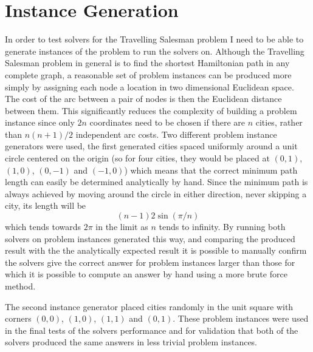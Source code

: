 \documentclass[12pt,a4paper,twoside,openright]{report}
\begin{document}
\section{Instance Generation}
In order to test solvers for the Travelling Salesman problem I need to be able to generate instances of the problem to run the solvers on. Although the Travelling Salesman problem in general is to find the shortest Hamiltonian path in any complete graph, a reasonable set of problem instances can be produced more simply by assigning each node a location in two dimensional Euclidean space\cite{advancedalgos}. The cost of the arc between a pair of nodes is then the Euclidean distance between them. This significantly reduces the complexity of building a problem instance since only $2n$ coordinates need to be chosen if there are $n$ cities, rather than $n(n+1)/2$ independent arc costs. Two different problem instance generators were used, the first generated cities spaced uniformly around a unit circle centered on the origin (so for four cities, they would be placed at $(0,1)$, $(1,0)$, $(0, -1)$ and $(-1, 0)$) which means that the correct minimum path length can easily be determined analytically by hand. Since the minimum path is always achieved by moving around the circle in either direction, never skipping a city, its length will be
$$
(n-1)2\sin(\pi/n)
$$
which tends towards $2\pi$ in the limit as $n$ tends to infinity. By running both solvers on problem instances generated this way, and comparing the produced result with the the analytically expected result it is possible to manually confirm the solvers give the correct answer for problem instances larger than those for which it is possible to compute an answer by hand using a more brute force method. 

The second instance generator placed cities randomly in the unit square with corners $(0,0)$, $(1,0)$, $(1,1)$ and $(0,1)$.  These problem instances were used in the final tests of the solvers performance and for validation that both of the solvers produced the same answers in less trivial problem instances.
\end{document}
